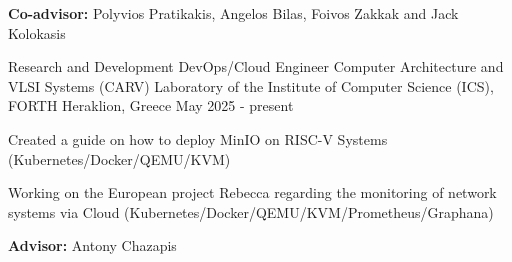 \begin{cventries}
{\begin{cvitems}
        \item{\textbf{Co-advisor:} Polyvios Pratikakis, Angelos Bilas, Foivos Zakkak and Jack Kolokasis}
      \end{cvitems}
    }
  \cventry
    {Research and Development DevOps/Cloud Engineer} %
    {Computer Architecture and VLSI Systems (CARV) Laboratory of the Institute of Computer Science (ICS), FORTH} %
    {Heraklion, Greece} %
    {May 2025 - present} %
    {
      \begin{cvitems} %
      \item {Created a guide on how to deploy MinIO on RISC-V Systems (Kubernetes/Docker/QEMU/KVM)}
      \item {Working on the European project Rebecca regarding the monitoring of network systems via Cloud (Kubernetes/Docker/QEMU/KVM/Prometheus/Graphana)}
        \item{\textbf{Advisor:} Antony Chazapis}
      \end{cvitems}
    }
\end{cventries}

